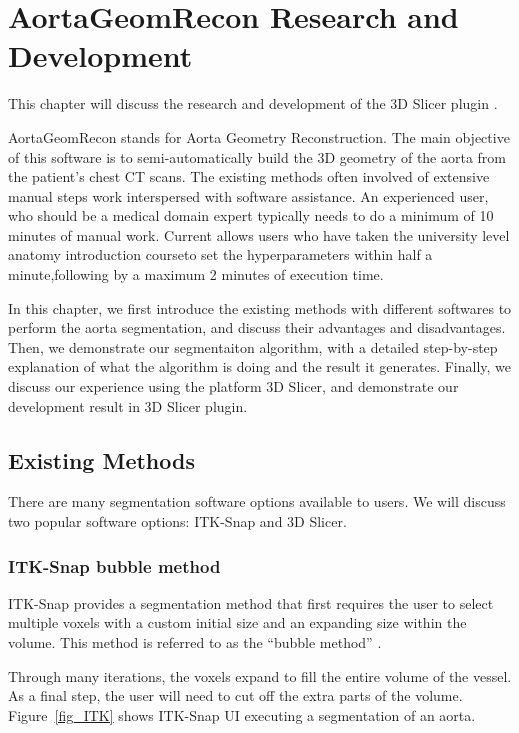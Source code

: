 \chapter{AortaGeomRecon Research and Development}

This chapter will discuss the research and development of the 3D Slicer plugin \progname{}.

AortaGeomRecon stands for Aorta Geometry Reconstruction. The main objective of this software is to semi-automatically build the 3D geometry of the aorta from the patient's chest CT scans.  The existing methods often involved of extensive manual steps work interspersed with software assistance. An experienced user, who should be a medical domain expert typically needs to do a minimum of 10 minutes of manual work.
Current \progname{} allows users who have taken the university level anatomy introduction courseto set the hyperparameters within half a minute,following by a maximum 2 minutes of execution time.

In this chapter, we first introduce the existing methods with different softwares to perform the aorta segmentation, and discuss their advantages and disadvantages. Then, we demonstrate our segmentaiton algorithm, with a detailed step-by-step explanation of what the algorithm is doing and the result it generates. Finally, we discuss our experience using the platform 3D Slicer, and demonstrate our development result in 3D Slicer plugin.

\section{Existing Methods}
There are many segmentation software options available to users. We will discuss two popular software options: ITK-Snap and 3D Slicer.

\subsection{ITK-Snap bubble method} 
\indent
ITK-Snap provides a segmentation method that first requires the user to select multiple voxels with a custom initial size and an expanding size within the volume. This method is referred to as the ``bubble method'' \cite{gerig}.

Through many iterations, the voxels expand to fill the entire volume of the vessel. As a final step, the user will need to cut off the extra parts of the volume. Figure~\ref{fig_ITK} shows ITK-Snap UI executing a segmentation of an aorta.

